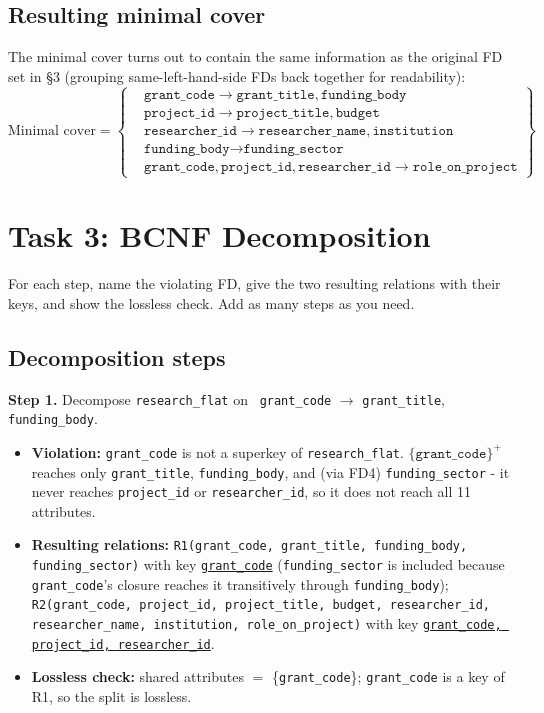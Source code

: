 \documentclass[11pt, letterpaper]{article}
\newcommand{\attr}[1]{\texttt{#1}}
\newcommand{\fd}{\ensuremath{\rightarrow}}
\newcommand{\clo}[1]{\ensuremath{\{#1\}^{+}}}
\newcommand{\pk}[1]{\underline{\texttt{#1}}}          %
\begin{document}
\subsection*{Resulting minimal cover}
The minimal cover turns out to contain the same information as the original FD set in \S3 (grouping same-left-hand-side FDs back together for readability):
\[
\text{Minimal cover} = \left\{
\begin{aligned}
&\attr{grant\_code} \fd{} \attr{grant\_title}, \attr{funding\_body}\\
&\attr{project\_id} \fd{} \attr{project\_title}, \attr{budget}\\
&\attr{researcher\_id} \fd{} \attr{researcher\_name}, \attr{institution}\\
&\attr{funding\_body} \fd{} \attr{funding\_sector}\\
&\attr{grant\_code}, \attr{project\_id}, \attr{researcher\_id} \fd{} \attr{role\_on\_project}
\end{aligned}
\right\}
\]

\section{Task 3: BCNF Decomposition}

For each step, name the violating FD, give the two resulting relations with their keys, and show the lossless check. Add as many steps as you need.

\subsection*{Decomposition steps}
\textbf{Step 1.} Decompose \attr{research\_flat} on \ \attr{grant\_code} \fd{} \attr{grant\_title}, \attr{funding\_body}.
\begin{itemize}
  \item \textbf{Violation:} \attr{grant\_code} is not a superkey of \attr{research\_flat}. $\clo{\attr{grant\_code}}$ reaches only \attr{grant\_title}, \attr{funding\_body}, and (via FD4) \attr{funding\_sector} - it never reaches \attr{project\_id} or \attr{researcher\_id}, so it does not reach all 11 attributes.
  \item \textbf{Resulting relations:}
    \attr{R1(grant\_code, grant\_title, funding\_body, funding\_sector)} with key \pk{grant\_code} (\attr{funding\_sector} is included because \attr{grant\_code}'s closure reaches it transitively through \attr{funding\_body}); \quad
    \attr{R2(grant\_code, project\_id, project\_title, budget, researcher\_id, researcher\_name, institution, role\_on\_project)} with key \pk{grant\_code, project\_id, researcher\_id}.
  \item \textbf{Lossless check:} shared attributes $=$ \{\attr{grant\_code}\}; \attr{grant\_code} is a key of R1, so the split is lossless.
\end{itemize}
\end{document}
